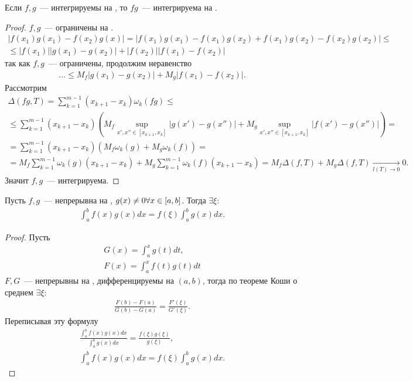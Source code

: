 \documentclass[../main.tex]{subfiles}
\begin{document}
\begin{proposition}
    Если $f, g$~--- интегрируемы на \segab, то $fg$~--- интегрируема на \segab.
\end{proposition}

\begin{proof}
    $f, g$~--- ограничены на \segab. 
    \begin{gather}
        \left| f(x_1)g(x_1)-f(x_2)g(x) \right| = \left| f(x_1)g(x_1)-f(x_1)g(x_2)+f(x_1)g(x_2)-f(x_2)g(x_2) \right| \leq \\ \leq \left| f(x_1) \right| \left| g(x_1) - g(x_2) \right| + \left| f(x_2) \right| \left| f(x_1)-f(x_2) \right| 
    \end{gather}
    так как $f, g$~--- ограничены, продолжим неравенство 
    \begin{gather} 
      \dots\leq M_f \left| g(x_1)-g(x_2) \right| +M_g \left| f(x_1) - f(x_2) \right|. 
    \end{gather}
    Рассмотрим
    \begin{multline} 
      \Delta(fg,T) = \sum_{k=1}^{m-1} (x_{k+1} - x_k) \omega_k(fg) \leq \\ \leq\sum_{k=1}^{m-1} (x_{k+1}-x_{k}) \left(M_f \sup_{x', x'' \in [x_{k+1},x_{k}]} \left| g(x') - g(x'') \right| + M_g \sup_{x', x'' \in [x_{k+1},x_{k}]} \left| f(x') - g(x'') \right|  \right) = \\ = \sum_{k=1}^{m-1} (x_{k+1}-x_{k}) \left(M_f \omega_k(g) + M_g \omega_k(f)\right) = \\ = M_f\sum_{k=1}^{m-1} \omega_k(g) (x_{k+1}-x_{k}) + M_g \sum_{k=1}^{m-1} \omega_k (f) (x_{k+1}-x_{k}) = M_f \Delta(f,T) + M_g \Delta(f, T)  \xrightarrow[l(T) \to  0 ]{} 0.
    \end{multline}
    Значит $f, g$~--- интегрируема.
\end{proof}

\begin{proposition}
    Пусть $f, g$~--- непрерывна на \segab, $g(x) \neq 0 \forall x \in [a,b]$. Тогда $\exists \xi$:
    \begin{gather} 
    \int_{a}^{b} f(x)g(x) dx = f(\xi) \int_{a}^{b} g(x)dx.
    \end{gather}
\end{proposition}

\begin{proof}
    Пусть 
    \begin{gather} 
      G(x) = \int_{a}^{x} g(t) dt, \\
      F(x) = \int_{a}^{x} f(t)g(t)dt 
    \end{gather}
    $F,G$~--- непрерывны на \segab, дифференцируемы на $(a,b)$, тогда по теореме Коши о среднем $\exists \xi$: 
    \begin{gather} 
      \frac{F(b) - F(a)}{G(b) - G(a)} = \frac{F'(\xi)}{G'(\xi)}. 
    \end{gather} 
    Переписывая эту формулу 
    \begin{gather} 
      \frac{\int_{a}^{b} f(x)g(x)dx}{\int_{a}^{b} g(x)dx} = \frac{f(\xi)g(\xi)}{g(\xi)}, \\
      \int_{a}^{b} f(x)g(x)dx = f(\xi) \int_{a}^{b} g(x) dx.
    \end{gather}
\end{proof}
\end{document}
